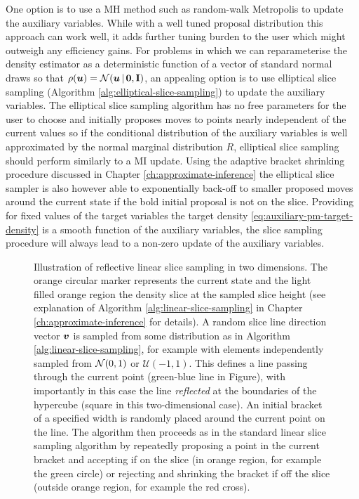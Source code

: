 One option is to use a \ac{MH} method such as random-walk Metropolis to update the auxiliary variables. While with a well tuned proposal distribution this approach can work well, it adds further tuning burden to the user which might outweigh any efficiency gains. For problems in which we can reparameterise the density estimator as a deterministic function of a vector of standard normal draws so that $\rho(\vct{u}) = \nrm{\vct{u} \gvn \vct{0},\mathbf{I}}$, an appealing option is to use elliptical slice sampling (Algorithm \ref{alg:elliptical-slice-sampling}) to update the auxiliary variables. The elliptical slice sampling algorithm has no free parameters for the user to choose and initially proposes moves to points nearly independent of the current values \citep{murray2010elliptical} so if the conditional distribution of the auxiliary variables is well approximated by the normal marginal distribution $R$, elliptical slice sampling should perform similarly to a \ac{MI} update. Using the adaptive bracket shrinking procedure discussed in Chapter \ref{ch:approximate-inference} the elliptical slice sampler is also however able to exponentially back-off to smaller proposed moves around the current state if the bold initial proposal is not on the slice. Providing for fixed values of the target variables the target density \eqref{eq:auxiliary-pm-target-density} is a smooth function of the auxiliary variables, the slice sampling procedure will always lead to a non-zero update of the auxiliary variables. %

\begin{figure}[t]
\centering
{}
\caption[Reflective linear slice sampling.]{Illustration of reflective linear slice sampling in two dimensions. The orange circular marker represents the current state and the light filled orange region the density slice at the sampled slice height (see explanation of Algorithm \ref{alg:linear-slice-sampling} in Chapter \ref{ch:approximate-inference} for details). A random slice line direction vector $\boldsymbol{v}$ is sampled from some distribution as in Algorithm \ref{alg:linear-slice-sampling}, for example with elements independently sampled from $\nrm{0,1}$ or $\mathcal{U}(-1,1)$. This defines a line passing through the current point (green-blue line in Figure), with importantly in this case the line \emph{reflected} at the boundaries of the hypercube (square in this two-dimensional case). An initial bracket of a specified width is randomly placed around the current point on the line. The algorithm then proceeds as in the standard linear slice sampling algorithm by repeatedly proposing a point in the current bracket and accepting if on the slice (in orange region, for example the green circle) or rejecting and shrinking the bracket if off the slice (outside orange region, for example the red cross).}
\label{fig:reflective-linear-slice-sampling}
\end{figure}

